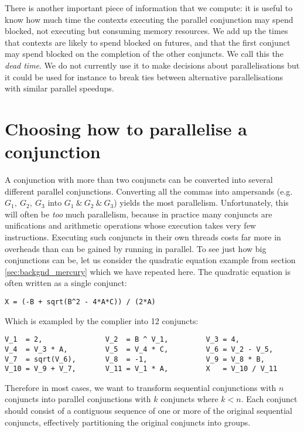 There is another important piece of information that we compute:
it is useful to know how much time the contexts executing the parallel
conjunction may spend blocked,
not executing but consuming memory resources.
We add up the times that contexts are likely to spend blocked on futures,
and that the first conjunct may spend blocked on the completion of the other
conjuncts.
We call this the \emph{dead time}.
We do not currently use it to make decisions about parallelisations but it
could be used for instance to break ties between alternative
parallelisations with similar parallel speedups.


\section{Choosing how to parallelise a conjunction}
\label{sec:overlap_howto}


A conjunction with more than two conjuncts can be converted into several
different parallel conjunctions.
Converting all the commas into ampersands
(e.g.\ $G_1,~G_2,~G_3$ into $G_1~\&~G_2~\&~G_3$)
yields the most parallelism.
Unfortunately, this will often be \emph{too} much parallelism,
because in practice many conjuncts are unifications
and arithmetic operations whose execution takes very few instructions.
Executing such conjuncts in their own threads
costs far more in overheads than can be gained by running in parallel.
To see just how big conjunctions can be,
let us consider the quadratic equation example
from section \ref{sec:backgnd_mercury} which we have repeated here.
The quadratic equation is often written as a single conjunct:

\begin{verbatim}
X = (-B + sqrt(B^2 - 4*A*C)) / (2*A)
\end{verbatim}

\noindent
Which is exampled by the complier into 12 conjuncts:

\begin{verbatim}
V_1  = 2,               V_2  = B ^ V_1,         V_3 = 4,
V_4  = V_3 * A,         V_5  = V_4 * C,         V_6 = V_2 - V_5,
V_7  = sqrt(V_6),       V_8  = -1,              V_9 = V_8 * B,
V_10 = V_9 + V_7,       V_11 = V_1 * A,         X   = V_10 / V_11
\end{verbatim}

\noindent
Therefore in most cases,
we want to transform sequential conjunctions with $n$ conjuncts into
parallel conjunctions with $k$ conjuncts where $k < n$.
Each conjunct should consist of a contiguous sequence
of one or more of the original sequential conjuncts,
effectively partitioning the original conjuncts into groups.

